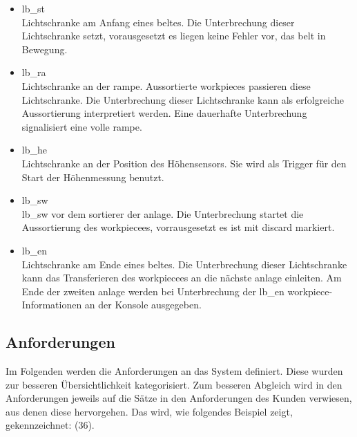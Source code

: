 \begin{itemize}
    \begin{itemize}
        \item \gls{lb_st}\\
        Lichtschranke am Anfang eines \gls{belt}es.
        Die Unterbrechung dieser Lichtschranke setzt, vorausgesetzt es liegen keine
        Fehler vor, das \gls{belt} in Bewegung.
        \item \gls{lb_ra}\\
        Lichtschranke an der \gls{rampe}. Aussortierte \Glspl{workpiece} passieren diese Lichtschranke.
        Die Unterbrechung dieser Lichtschranke kann als erfolgreiche Aussortierung interpretiert werden.
        Eine dauerhafte Unterbrechung signalisiert eine volle \gls{rampe}.
        \item \gls{lb_he}\\
        Lichtschranke an der Position des Höhensensors.
        Sie wird als Trigger für den Start der Höhenmessung benutzt.
        \item \gls{lb_sw}\\
        \gls{lb_sw} vor dem \Gls{sortierer} der \gls{anlage}.
        Die Unterbrechung startet die Aussortierung des \gls{workpiece}es, vorrausgesetzt es ist mit \gls{discard} markiert.
        \item \gls{lb_en}\\
        Lichtschranke am Ende eines \gls{belt}es.
        Die Unterbrechung dieser Lichtschranke kann das Transferieren des \Gls{workpiece}es an die nächste \gls{anlage} einleiten.
        Am Ende der zweiten \gls{anlage} werden bei Unterbrechung der \gls{lb_en} \Gls{workpiece}-Informationen an der Konsole ausgegeben.
    \end{itemize}
\end{itemize}

\subsection{Anforderungen}\label{subsec:anforderungen}

Im Folgenden werden die Anforderungen an das System definiert. Diese wurden zur besseren
Übersichtlichkeit kategorisiert. Zum besseren Abgleich wird in den
Anforderungen jeweils auf die Sätze in den Anforderungen des Kunden verwiesen, aus denen diese hervorgehen.
Das wird, wie folgendes Beispiel zeigt, gekennzeichnet: (36). 

